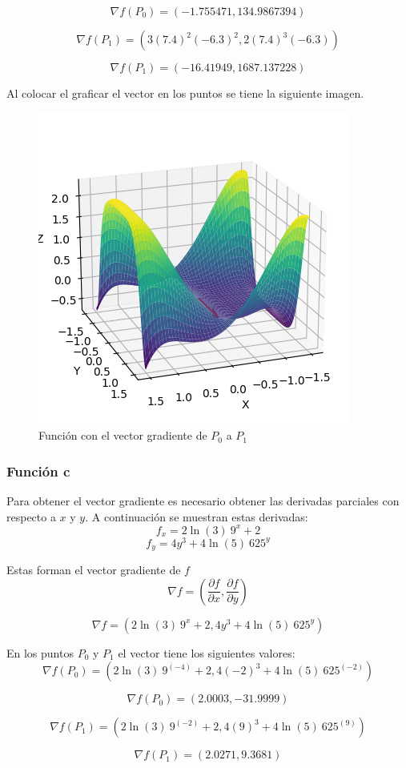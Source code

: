 \documentclass[12 pt]{article}
\begin{document}
\[
    \nabla f(P_0) = ( -1.755471,  134.9867394)
\]

\[
    \nabla f(P_1) = ( 3(7.4)^2(-6.3)^2,  2(7.4)^3(-6.3))
\]

\[
    \nabla f(P_1) = ( -16.41949,  1687.137228)
\]

Al colocar el graficar el vector en los puntos se tiene la siguiente imagen.
\begin{figure}[H]
    \centering
    \includegraphics[width=0.5\linewidth]{img/b_v.png}
    \caption{Función con el vector gradiente de $P_0$ a $P_1$}
    \label{fig:enter-label}
\end{figure}

\subsubsection{Función c}
Para obtener el vector gradiente es necesario obtener las derivadas parciales con respecto a $x$ y $y$. A continuación se muestran estas derivadas:
\[
    f_x = 2\ln \left(3\right) \:9^x+2
\]
\[
    f_y = 4y^3+4\ln \left(5\right) \:625^y
\]

Estas forman el vector gradiente de $f$
\[
    \nabla f = ( \frac{\partial f}{\partial x},  \frac{\partial f}{\partial y})
\]

\[
    \nabla f = ( 2\ln \left(3\right) \:9^x+2,  4y^3+4\ln \left(5\right) \:625^y)
\]

En los puntos $P_0$ y $P_1$ el vector tiene los siguientes valores:
\[
    \nabla f(P_0) = ( 2\ln \left(3\right) \:9^(-4)+2, 4(-2)^3+4\ln \left(5\right) \:625^(-2))
\]

\[
    \nabla f(P_0) = ( 2.0003, -31.9999)
\]

\[
    \nabla f(P_1) = ( 2\ln \left(3\right) \:9^(-2)+2, 4(9)^3+4\ln \left(5\right) \:625^(9))
\]

\[
    \nabla f(P_1) = ( 2.0271,  9.3681)
\]
\end{document}
